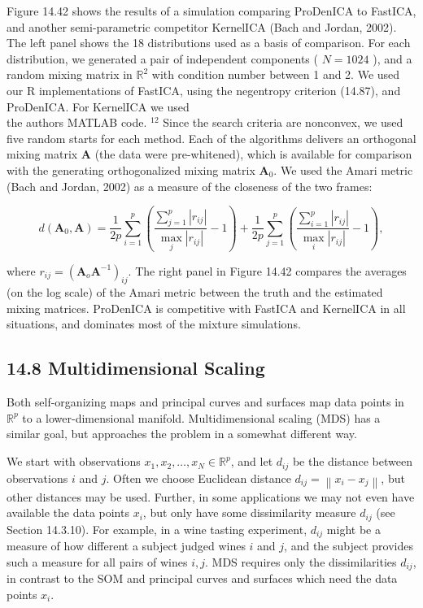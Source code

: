 \documentclass[10pt]{article}
\begin{document}
Figure 14.42 shows the results of a simulation comparing ProDenICA to FastICA, and another semi-parametric competitor KernelICA (Bach and Jordan, 2002). The left panel shows the 18 distributions used as a basis of comparison. For each distribution, we generated a pair of independent components ( $N=1024$ ), and a random mixing matrix in $\mathbb{R}^{2}$ with condition number between 1 and 2. We used our R implementations of FastICA, using the negentropy criterion (14.87), and ProDenICA. For KernelICA we used\\
the authors MATLAB code. ${ }^{12}$ Since the search criteria are nonconvex, we used five random starts for each method. Each of the algorithms delivers an orthogonal mixing matrix $\mathbf{A}$ (the data were pre-whitened), which is available for comparison with the generating orthogonalized mixing matrix $\mathbf{A}_{0}$. We used the Amari metric (Bach and Jordan, 2002) as a measure of the closeness of the two frames:


\begin{equation*}
d\left(\mathbf{A}_{0}, \mathbf{A}\right)=\frac{1}{2 p} \sum_{i=1}^{p}\left(\frac{\sum_{j=1}^{p}\left|r_{i j}\right|}{\max _{j}\left|r_{i j}\right|}-1\right)+\frac{1}{2 p} \sum_{j=1}^{p}\left(\frac{\sum_{i=1}^{p}\left|r_{i j}\right|}{\max _{i}\left|r_{i j}\right|}-1\right), \tag{14.97}
\end{equation*}


where $r_{i j}=\left(\mathbf{A}_{o} \mathbf{A}^{-1}\right)_{i j}$. The right panel in Figure 14.42 compares the averages (on the log scale) of the Amari metric between the truth and the estimated mixing matrices. ProDenICA is competitive with FastICA and KernelICA in all situations, and dominates most of the mixture simulations.

\subsection*{14.8 Multidimensional Scaling}
Both self-organizing maps and principal curves and surfaces map data points in $\mathbb{R}^{p}$ to a lower-dimensional manifold. Multidimensional scaling (MDS) has a similar goal, but approaches the problem in a somewhat different way.

We start with observations $x_{1}, x_{2}, \ldots, x_{N} \in \mathbb{R}^{p}$, and let $d_{i j}$ be the distance between observations $i$ and $j$. Often we choose Euclidean distance $d_{i j}=\left\|x_{i}-x_{j}\right\|$, but other distances may be used. Further, in some applications we may not even have available the data points $x_{i}$, but only have some dissimilarity measure $d_{i j}$ (see Section 14.3.10). For example, in a wine tasting experiment, $d_{i j}$ might be a measure of how different a subject judged wines $i$ and $j$, and the subject provides such a measure for all pairs of wines $i, j$. MDS requires only the dissimilarities $d_{i j}$, in contrast to the SOM and principal curves and surfaces which need the data points $x_{i}$.
\end{document}
